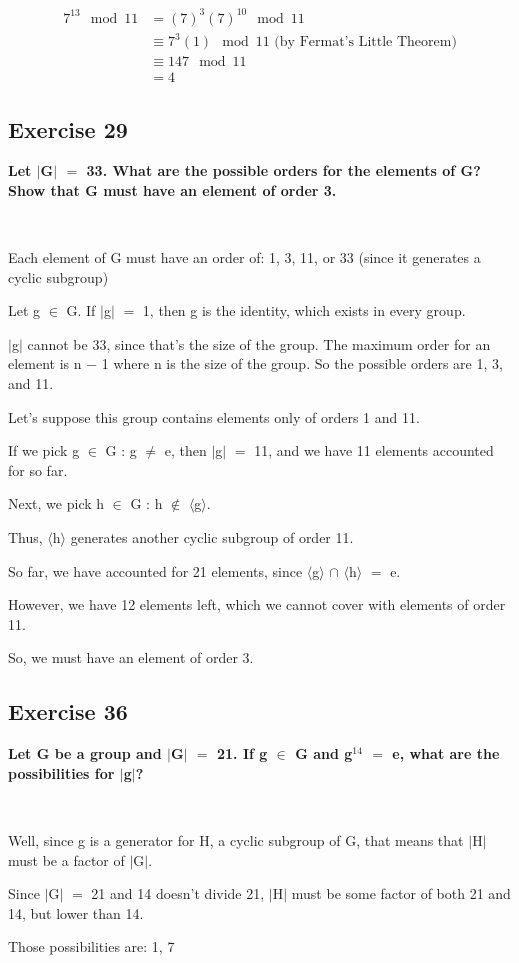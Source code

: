 \documentclass{article}
\newcommand{\mt}[1]{\ensuremath{#1}}
\newcommand\ssc[2][\DefaultOpt]{%
  \def\DefaultOpt{#2}%
  \subsection[#1]{#2}%
}
\newcommand{\mem}{\mt{\in} }
\newcommand{\av}[1]{\mt{|}#1\mt{|}}  %
\newcommand{\abk}[1]{\mt{\langle}#1\mt{\rangle}}
\newcommand{\ms}{\mt{-} }
\newcommand{\eql}{\mt{=} }
\newcommand{\uf}[2]{#1\mt{^{#2}}}
\newcommand{\eqn}[1]{\[#1\]}
\newcommand{\splt}[1]{\begin{split}#1\end{split}}
\newcommand{\inn}{\mt{\cap} }
\begin{document}
{{\eqn{
	\splt{
		7^{13}\mod 11 & = (7)^3(7)^{10} \mod 11 \\
		& \equiv 7^3(1) \mod 11 \textrm{ (by Fermat's Little Theorem)} \\
		& \equiv 147 \mod 11 \\
		& = 4
	}
}
}
\ssc{Exercise 29}{

\textbf{Let \av{G} \eql 33. What are the possible orders for the elements of G? Show that G must have an element of order 3.}

\

Each element of G must have an order of: 1, 3, 11, or 33 (since it generates a cyclic subgroup)

Let g \mem G. If \av{g} \eql 1, then g is the identity, which exists in every group.

\av{g} cannot be 33, since that's the size of the group. The maximum order for an element is n \ms 1 where n is the size of the group. So the possible orders are 1, 3, and 11.

Let's suppose this group contains elements only of orders 1 and 11.

If we pick g \mem G : g $\neq$ e, then \av{g} \eql 11, and we have 11 elements accounted for so far.

Next, we pick h \mem G : h $\notin$ \abk{g}.

Thus, \abk{h} generates another cyclic subgroup of order 11.

So far, we have accounted for 21 elements, since \abk{g} \inn \abk{h} \eql e.

However, we have 12 elements left, which we cannot cover with elements of order 11.

So, we must have an element of order 3.

}
\ssc{Exercise 36}{
\textbf{Let G be a group and \av{G} \eql 21. If g \mem G and \uf{g}{14} \eql e, what are the possibilities for \av{g}?}

\

Well, since g is a generator for H, a cyclic subgroup of G, that means that \av{H} must be a factor of \av{G}.

Since \av{G} \eql 21 and 14 doesn't divide 21, \av{H} must be some factor of both 21 and 14, but lower than 14.

Those possibilities are: 1, 7 
}
}
\end{document}
